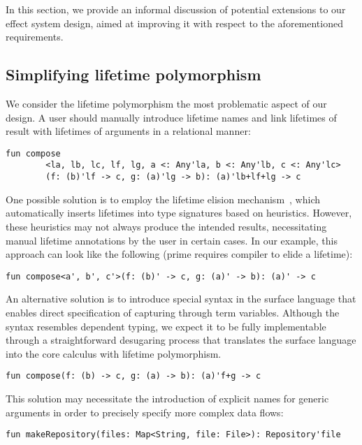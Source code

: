 \documentclass[acmsmall,review,screen]{acmart}
\begin{document}
In this section, we provide an informal discussion of potential extensions to our effect system design, aimed at improving it with respect to the aforementioned requirements.

\subsection{Simplifying lifetime polymorphism} \label{subsec:lifetime-poly-enhancement}

We consider the lifetime polymorphism the most problematic aspect of our design.
A user should manually introduce lifetime names and link lifetimes of result with lifetimes of arguments in a relational manner:
\begin{lstlisting}[language=colang]
    fun compose
        <la, lb, lc, lf, lg, a <: Any'la, b <: Any'lb, c <: Any'lc>
        (f: (b)'lf -> c, g: (a)'lg -> b): (a)'lb+lf+lg -> c
\end{lstlisting}

One possible solution is to employ the lifetime elision mechanism~\cite{matsakis2014rust}, which automatically inserts lifetimes into type signatures based on heuristics.
However, these heuristics may not always produce the intended results, necessitating manual lifetime annotations by the user in certain cases.
In our example, this approach can look like the following (prime requires compiler to elide a lifetime):
\begin{lstlisting}[language=colang]
    fun compose<a', b', c'>(f: (b)' -> c, g: (a)' -> b): (a)' -> c
\end{lstlisting}

An alternative solution is to introduce special syntax in the surface language that enables direct specification of capturing through term variables.
Although the syntax resembles dependent typing, we expect it to be fully implementable through a straightforward desugaring process that translates the surface language into the core calculus with lifetime polymorphism.
\begin{lstlisting}[language=colang]
    fun compose(f: (b) -> c, g: (a) -> b): (a)'f+g -> c
\end{lstlisting}

This solution may necessitate the introduction of explicit names for generic arguments in order to precisely specify more complex data flows:
\begin{lstlisting}[language=colang]
    fun makeRepository(files: Map<String, file: File>): Repository'file
\end{lstlisting}
\end{document}
